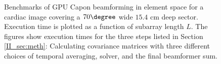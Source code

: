 \begin{figure}[!t]
\centerline{
\hfil
{}}
\caption{Benchmarks of GPU Capon beamforming in element space for a cardiac image covering a $70\degree$ wide $15.4$ cm deep sector. Execution time is plotted as a function of subarray length $L$. The figures show execution times for the three steps listed in Section \ref{II_sec:meth}: Calculating covariance matrices with three different choices of temporal averaging, solver, and the final beamformer sum.}
\label{II_fig:bench}
\end{figure}


